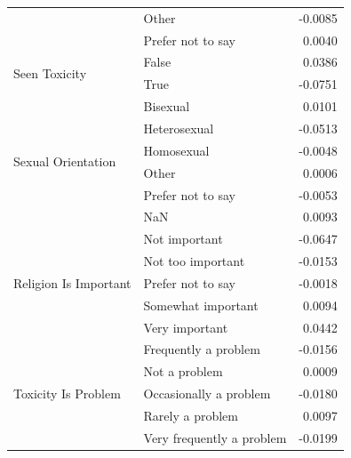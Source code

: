 \begin{table}[h!]
\begin{tabular}{llr}
 & Other & -0.0085 \\
 & Prefer not to say & 0.0040 \\
\cline{1-3}
\multirow[t]{2}{*}{Seen Toxicity} & False & 0.0386 \\
 & True & -0.0751 \\
\cline{1-3}
\multirow[t]{6}{*}{Sexual Orientation} & Bisexual & 0.0101 \\
 & Heterosexual & -0.0513 \\
 & Homosexual & -0.0048 \\
 & Other & 0.0006 \\
 & Prefer not to say & -0.0053 \\
 & NaN & 0.0093 \\
\cline{1-3}
\multirow[t]{5}{*}{Religion Is Important} & Not important & -0.0647 \\
 & Not too important & -0.0153 \\
 & Prefer not to say & -0.0018 \\
 & Somewhat important & 0.0094 \\
 & Very important & 0.0442 \\
\cline{1-3}
\multirow[t]{5}{*}{Toxicity Is Problem} & Frequently a problem & -0.0156 \\
 & Not a problem & 0.0009 \\
 & Occasionally a problem & -0.0180 \\
 & Rarely a problem & 0.0097 \\
 & Very frequently a problem & -0.0199 \\
\cline{1-3}
\bottomrule
\end{tabular}
\end{table}
